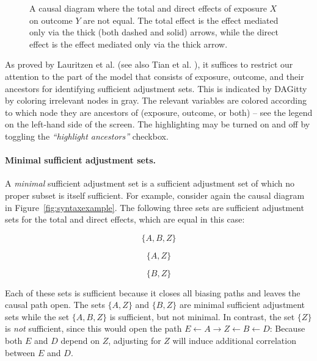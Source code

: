 \documentclass[a4paper]{article} %
\newcommand{\pp}{DAGitty\xspace}
\newcommand{\action}[1]{\emph{``#1''}}
\begin{document}
\begin{figure}
\begin{center}
\end{center}

\caption{A causal diagram where the total and direct 
effects of exposure $X$ on outcome $Y$ are not equal. The total effect is the effect
mediated only via the thick (both dashed and solid) arrows,
while the direct effect is the effect mediated only 
via the thick arrow.}
\label{fig:effects}

\end{figure}

As proved by Lauritzen et al. \cite{Lauritzen1990} 
(see also Tian et al. \cite{TianPP1998}), 
it suffices to restrict our attention to the part of the model that consists of exposure, 
outcome, and their ancestors for identifying sufficient adjustment sets. This is indicated
by \pp by coloring irrelevant nodes in gray. The relevant variables are colored according 
to which node they are ancestors of (exposure, outcome, or both) -- see the legend on the 
left-hand side of the screen. The highlighting may be turned on and off by toggling the 
\action{highlight ancestors} checkbox.

\paragraph{Minimal sufficient adjustment sets.} 

A \emph{minimal} sufficient adjustment set is a sufficient 
adjustment set of which no proper subset is itself sufficient. For example, 
consider again the causal diagram in Figure~\ref{fig:syntaxexample}. 
The following three sets are sufficient adjustment sets
for the total and direct effects, which are equal in this case: 

$$ \{A,B,Z\} $$

$$ \{A,Z\} $$

$$ \{B,Z\} $$ 

Each of these sets is sufficient because it closes all biasing paths and leaves 
the causal path open. The sets $\{A,Z\}$ and $\{B,Z\}$ are minimal sufficient adjustment 
sets while the set $\{A,B,Z\}$ is sufficient, but not minimal. 
In contrast, the set $\{Z\}$ is \emph{not} sufficient, since this would 
open  
the path $E \leftarrow A \rightarrow Z \leftarrow B \leftarrow D$: 
Because both $E$ and 
$D$ depend on $Z$, adjusting for $Z$ will induce 
additional correlation between $E$ and $D$. 
\end{document}
